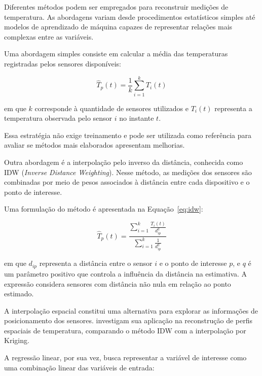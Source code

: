 Diferentes métodos podem ser empregados para reconstruir
medições de temperatura. As abordagens variam desde
procedimentos estatísticos simples até modelos de
aprendizado de máquina capazes de representar relações
mais complexas entre as variáveis.

Uma abordagem simples consiste em calcular a média das
temperaturas registradas pelos sensores disponíveis:

\begin{equation}
    \hat{T}_{p}(t) =
    \frac{1}{k}
    \sum_{i=1}^{k} T_i(t)
    \label{eq:media_sensores}
\end{equation}

\noindent
em que $k$ corresponde à quantidade de sensores utilizados
e $T_i(t)$ representa a temperatura observada pelo sensor
$i$ no instante $t$.

Essa estratégia não exige treinamento e pode ser utilizada
como referência para avaliar se métodos mais elaborados
apresentam melhorias.

Outra abordagem é a interpolação pelo inverso da distância,
conhecida como IDW (\textit{Inverse Distance Weighting}).
Nesse método, as medições dos sensores são combinadas
por meio de pesos associados à distância entre cada
dispositivo e o ponto de interesse.

Uma formulação do método é apresentada na
Equação~\ref{eq:idw}:

\begin{equation}
    \hat{T}_{p}(t) =
    \frac{
        \displaystyle\sum_{i=1}^{k}
        \frac{T_i(t)}{d_{ip}^{q}}
    }{
        \displaystyle\sum_{i=1}^{k}
        \frac{1}{d_{ip}^{q}}
    }
    \label{eq:idw}
\end{equation}

\noindent
em que $d_{ip}$ representa a distância entre o sensor $i$
e o ponto de interesse $p$, e $q$ é um parâmetro positivo
que controla a influência da distância na estimativa.
A expressão considera sensores com distância não nula
em relação ao ponto estimado.

A interpolação espacial constitui uma alternativa para
explorar as informações de posicionamento dos sensores.
 investigam sua
aplicação na reconstrução de perfis espaciais de temperatura,
comparando o método IDW com a interpolação por Kriging.

A regressão linear, por sua vez, busca representar a variável
de interesse como uma combinação linear das variáveis
de entrada:

